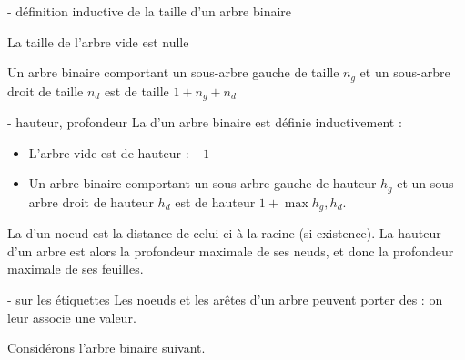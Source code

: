 \begin{remarque}{7.4}{ - définition inductive de la taille d'un arbre binaire}
    \item La taille de l'arbre vide est nulle
    \item Un arbre binaire comportant un sous-arbre gauche de taille $n_g$ et un sous-arbre droit de taille $n_d$ est de taille $1+n_g+n_d$
\end{remarque}

\begin{definition}{7.5}{ - hauteur, profondeur}
    La  d'un arbre binaire est définie inductivement : \begin{itemize}
        \item L'arbre vide est de hauteur : $-1$
        \item Un arbre binaire comportant un sous-arbre gauche de hauteur $h_g$ et un sous-arbre droit de hauteur $h_d$ est de hauteur $1+\max{h_g,h_d}$.
    \end{itemize}
    La  d'un noeud est la distance de celui-ci à la racine (si existence). La hauteur d'un arbre est alors la profondeur maximale de ses neuds, et donc la profondeur maximale de ses feuilles.
\end{definition}

\begin{remarque}{7.6}{ - sur les étiquettes}
    Les noeuds et les arêtes d'un arbre peuvent porter des  : on leur associe une valeur.
\end{remarque}

\begin{exemple}{7.7}{}
    \item Considérons l'arbre binaire suivant.
\end{exemple}
